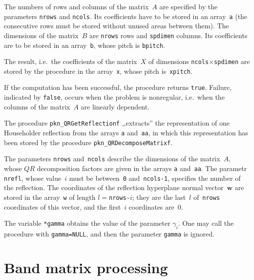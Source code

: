 The numbers of rows and columns of the matrix~$A$ are specified by the
parameters \texttt{nrows} and \texttt{ncols}. Its coefficients have to be stored
in an array~\texttt{a} (the consecutive rows must be stored without unused
areas between them). The dimensions of the matrix~$B$ are \texttt{nrows}
rows and \texttt{spdimen} columns. Its coefficients are to be stored
in an array~\texttt{b}, whose pitch is \texttt{bpitch}.

The result, i.e.\ the coefficients of the matrix~$X$ of dimensions
\texttt{ncols}$\times$\texttt{spdimen} are stored by the procedure
in the array~\texttt{x}, whose pitch is~\texttt{xpitch}.

If the computation has been successful, the procedure returns \texttt{true}.
Failure, indicated by \texttt{false}, occurs when the problem is nonregular,
i.e.\ when the columns of the matrix~$A$ are linearly dependent.

\vspace{\bigskipamount}
\begin{sloppypar}
The procedure \texttt{pkn\_QRGetReflectionf} ,,extracts'' the representation
of one Householder reflection from the arrays \texttt{a} and~\texttt{aa},
in which this representation has been stored by the procedure
\texttt{pkn\_QRDecomposeMatrixf}.%
\end{sloppypar}

The parameters \texttt{nrows} and~\texttt{ncols} describe the dimensions of the
matrix~$A$, whose $QR$ decomposition factors are given in the arrays
\texttt{a} and~\texttt{aa}. The parametr \texttt{nrefl}, whose value~$i$
must be between~\texttt{0} and~\texttt{ncols-1}, specifies the number
of the reflection. The coordinates of the reflection hyperplane normal
vector~$\bm{w}$ are stored in the array~\texttt{w} of length
$l=$\texttt{nrows-$i$}; they are the last~$l$ of~\texttt{nrows} coordinates
of this vector, and the first~$i$ coordinates are~$0$.

The variable \texttt{*gamma} obtains the value of the parameter $\gamma_i$.
One may call the procedure with \texttt{gamma=NULL}, and then the parameter
\texttt{gamma} is ignored.



\newpage
\section{\label{sect:band:matrix}Band matrix processing}


